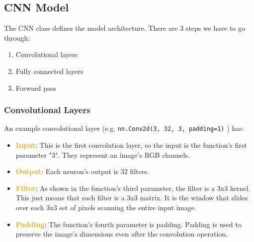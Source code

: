 \subsection{CNN Model}
The CNN class defines the model architecture. There are 3 steps we have to go through:
\begin{enumerate}
    \item Convolutional layers
    \item Fully connected layers
    \item Forward pass
\end{enumerate}

\subsubsection{Convolutional Layers}
An example convolutional layer (e.g. \texttt{nn.Conv2d(3, 32, 3, padding=1)} ) has:
\begin{itemize}
    \item \textcolor{orange}{\textbf{Input}}: This is the first convolution layer, so the input is
    the function's first parameter "3". They represent an image's RGB channels. 
    \item \textcolor{orange}{\textbf{Output}}: Each neuron's output is 32 filters.
    \item \textcolor{orange}{\textbf{Filter}}: As shown in the function's third parameter, the filter 
    is a 3x3 kernel. This just means that each filter is a 3x3 matrix. It is the window that slides 
    over each 3x3 set of pixels scanning the entire input image.
    \item \textcolor{orange}{\textbf{Padding}}: The function's fourth parameter is padding. Padding 
    is used to preserve the image's dimensions even after the convolution operation.
\end{itemize}


